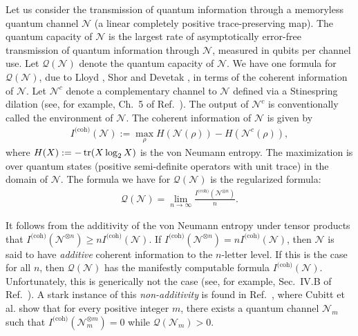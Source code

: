 \documentclass[12pt]{article}
\theoremstyle{definition}
\numberwithin{equation}{section}
\numberwithin{equation}{section}
\newcommand{\cN}{\mathcal{N}}
\newcommand{\cQ}{\mathcal{Q}}
\begin{document}
Let us consider the transmission of quantum information through a memoryless quantum channel \(\cN\) (a linear completely positive trace-preserving map). The quantum capacity of \(\cN\) is the largest rate of asymptotically error-free transmission of quantum information through \(\cN\), measured in qubits per channel use. Let \(\cQ (\cN)\) denote the quantum capacity of \(\cN\). We have one formula for \(\cQ  (\cN)\), due to Lloyd \cite{Lloyd1997}, Shor \cite{shor2002} and Devetak \cite{Devetak2005}, in terms of the coherent information of \(\cN\). Let \(\cN^c\) denote a complementary channel to \(\cN\) defined via a Stinespring dilation (see, for example, Ch.~5 of Ref.~\cite{Wilde2013}). The output of \(\cN^c\) is conventionally called the environment of \(\cN\). The coherent information of \(\cN\) is given by  
\begin{align}
\label{eq: coherent info}
I^{\text{(coh)}} (\cN) := \max_{\rho} H( \cN (\rho) ) - H (\cN^c (\rho)),
\end{align}
where \(H (X) := -\tr (X \log_2 X)\) is the von Neumann entropy. The maximization is over quantum states (positive semi-definite operators with unit trace) in the domain of \(\cN\). The formula we have for \(\cQ (\cN)\) is the regularized formula:
\begin{align}
\label{eq: quantum capacity}
\cQ (\cN) = \lim_{n \rightarrow \infty} \frac{I^{\text{(coh)}} (\cN^{\otimes n})}{n}.
\end{align}



It follows from the additivity of the von Neumann entropy under tensor products that \(I^{\text{(coh)}}(\cN^{\otimes n}) \geq n I^{\text{(coh)}} (\cN)\). If \(I^{\text{(coh)}}(\cN^{\otimes n}) = n I^{\text{(coh)}} (\cN)\), then \(\cN\) is said to have \textit{additive} coherent information to the \(n\)-letter level. If this is the case for all \(n\), then \(\cQ (\cN)\) has the manifestly computable formula \(I^{\text{(coh)}} (\cN)\). Unfortunately, this is generically not the case (see, for example,  Sec.~IV.B of Ref.~\cite{Koudia2022}). A stark instance of this \textit{non-additivity} is found in Ref.~\cite{Cubitt2015}, where Cubitt et al. show that for every positive integer \(m\), there exists a quantum channel \(\cN_m\) such that \(I^{\text{(coh)}} (\cN_m^{\otimes m}) = 0\) while \(\cQ(\cN_m) > 0\).  
\end{document}
